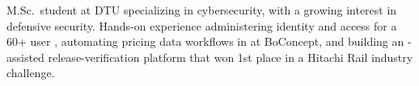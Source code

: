 
\begin{cvparagraph}
M.Sc.\ student at DTU specializing in cybersecurity, with a growing interest in defensive security. Hands-on experience administering identity and access for a 60+ user , automating pricing data workflows in  at BoConcept, and building an -assisted release-verification platform that won 1st place in a Hitachi Rail industry challenge.
\end{cvparagraph}
